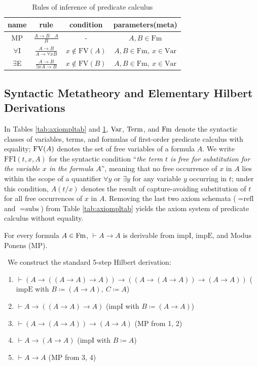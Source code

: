 \documentclass[10pt,a4paper]{article}
\begin{document}
\begin{table}[H]
\centering
\caption{Rules of inference of predicate calculus}
\label{tab:rulestab}
\begin{tabular}{|c|c|c|c|}
\hline
name & rule & condition & parameters(meta) \\ \hline
\hline
MP & \rule[-2.5ex]{0pt}{7ex} $\frac{A\to B\quad A}{B}$ & - & $A,B \in \textrm{Fm}$ \\ \hline
\hline
\rule[-2.5ex]{0pt}{7ex}
$\forall$I & $\frac{A\to B}{A\to \forall x B}$ & $x \notin \textrm{FV}(A)$ & $A,B \in \textrm{Fm},\ x \in \textrm{Var}$ \\ \hline
\hline
\rule[-2.5ex]{0pt}{7ex}
$\exists$E & $\frac{A\to B}{\exists x A\to B}$ & $x \notin \textrm{FV}(B)$ & $A,B \in \textrm{Fm},\ x \in \textrm{Var}$ \\ \hline
\end{tabular}
\end{table}

\subsection{Syntactic Metatheory and Elementary Hilbert Derivations}
In Tables \ref{tab:axiompltab} and \ref{tab:rulestab}, ${\textrm{Var}}$, ${\textrm{Term}}$, and ${\textrm{Fm}}$ denote the syntactic classes of variables, terms, and formulas of first-order predicate calculus with equality; ${\textrm{FV}}(A)$ denotes the set of free variables of a formula $A$. We write $\textrm{FFI}(t,x,A)$ for the syntactic condition ``\emph{the term $t$ is free for substitution for the variable $x$ in the formula $A$}'', meaning that no free occurrence of $x$ in $A$ lies within the scope of a quantifier $\forall y$ or $\exists y$ for any variable $y$ occurring in $t$; under this condition, $A(t/x)$ denotes the result of capture-avoiding substitution of $t$ for all free occurrences of $x$ in $A$. Removing the last two axiom schemata ($=\textrm{refl}$ and $=\textrm{subs}$) from Table \ref{tab:axiompltab} yields the axiom system of predicate calculus without equality.

\begin{lemma}\label{lem:id_law}
For every formula $A \in {\textrm{Fm}}$, $\vdash A \to A$ is derivable from $\textrm{impI}$, $\textrm{impE}$, and Modus Ponens ($\textrm{MP}$).
\end{lemma}
\myprf\ We construct the standard 5-step Hilbert derivation:
\begin{enumerate}
\item $\vdash (A \to ((A \to A) \to A)) \to ((A \to (A \to A)) \to (A \to A))$ \hfill ($\textrm{impE}$ with $B \coloneqq (A \to A),\ C \coloneqq A$)
\item $\vdash A \to ((A \to A) \to A)$ \hfill ($\textrm{impI}$ with $B \coloneqq (A \to A)$)
\item $\vdash (A \to (A \to A)) \to (A \to A)$ \hfill ($\textrm{MP}$ from 1, 2)
\item $\vdash A \to (A \to A)$ \hfill ($\textrm{impI}$ with $B \coloneqq A$)
\item $\vdash A \to A$ \hfill ($\textrm{MP}$ from 3, 4)
\end{enumerate}
\myqed
\end{document}
